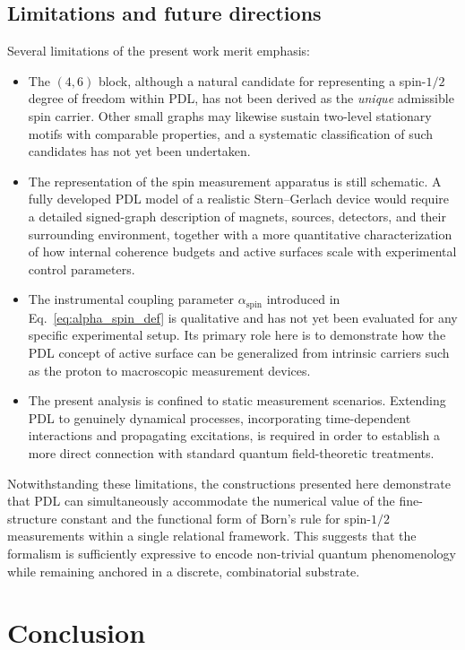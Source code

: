 \documentclass[11pt,a4paper]{article}
\numberwithin{equation}{section}
\begin{document}
\subsection{Limitations and future directions}

Several limitations of the present work merit emphasis:
\begin{itemize}
  \item The $(4,6)$ block, although a natural candidate for representing a spin-$1/2$ degree of freedom within PDL, has not been derived as the \emph{unique} admissible spin carrier. Other small graphs may likewise sustain two-level stationary motifs with comparable properties, and a systematic classification of such candidates has not yet been undertaken.
  \item The representation of the spin measurement apparatus is still schematic. A fully developed PDL model of a realistic Stern--Gerlach device would require a detailed signed-graph description of magnets, sources, detectors, and their surrounding environment, together with a more quantitative characterization of how internal coherence budgets and active surfaces scale with experimental control parameters.
  \item The instrumental coupling parameter $\alpha_{\mathrm{spin}}$ introduced in Eq.~\eqref{eq:alpha_spin_def} is qualitative and has not yet been evaluated for any specific experimental setup. Its primary role here is to demonstrate how the PDL concept of active surface can be generalized from intrinsic carriers such as the proton to macroscopic measurement devices.
  \item The present analysis is confined to static measurement scenarios. Extending PDL to genuinely dynamical processes, incorporating time-dependent interactions and propagating excitations, is required in order to establish a more direct connection with standard quantum field-theoretic treatments.
\end{itemize}

Notwithstanding these limitations, the constructions presented here demonstrate that PDL can simultaneously accommodate the numerical value of the fine-structure constant and the functional form of Born’s rule for spin-$1/2$ measurements within a single relational framework. This suggests that the formalism is sufficiently expressive to encode non-trivial quantum phenomenology while remaining anchored in a discrete, combinatorial substrate.

\section{Conclusion}
\label{sec:conclusion}
\end{document}
